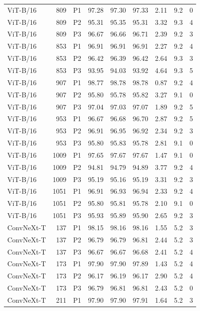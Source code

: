 {\begin{longtable}{lrlrrrrrr}
ViT-B/16 & 809 & P1 & 97.28 & 97.30 & 97.33 & 2.11 & 9.2 & 0 \\
ViT-B/16 & 809 & P2 & 95.31 & 95.35 & 95.31 & 3.32 & 9.3 & 4 \\
ViT-B/16 & 809 & P3 & 96.67 & 96.66 & 96.71 & 2.39 & 9.2 & 3 \\
ViT-B/16 & 853 & P1 & 96.91 & 96.91 & 96.91 & 2.27 & 9.2 & 4 \\
ViT-B/16 & 853 & P2 & 96.42 & 96.39 & 96.42 & 2.64 & 9.3 & 3 \\
ViT-B/16 & 853 & P3 & 93.95 & 94.03 & 93.92 & 4.64 & 9.3 & 5 \\
ViT-B/16 & 907 & P1 & 98.77 & 98.78 & 98.78 & 0.87 & 9.2 & 4 \\
ViT-B/16 & 907 & P2 & 95.80 & 95.78 & 95.82 & 3.27 & 9.1 & 0 \\
ViT-B/16 & 907 & P3 & 97.04 & 97.03 & 97.07 & 1.89 & 9.2 & 5 \\
ViT-B/16 & 953 & P1 & 96.67 & 96.68 & 96.70 & 2.87 & 9.2 & 5 \\
ViT-B/16 & 953 & P2 & 96.91 & 96.95 & 96.92 & 2.34 & 9.2 & 3 \\
ViT-B/16 & 953 & P3 & 95.80 & 95.83 & 95.78 & 2.81 & 9.1 & 0 \\
ViT-B/16 & 1009 & P1 & 97.65 & 97.67 & 97.67 & 1.47 & 9.1 & 0 \\
ViT-B/16 & 1009 & P2 & 94.81 & 94.79 & 94.89 & 3.77 & 9.2 & 4 \\
ViT-B/16 & 1009 & P3 & 95.19 & 95.16 & 95.19 & 3.31 & 9.2 & 3 \\
ViT-B/16 & 1051 & P1 & 96.91 & 96.93 & 96.94 & 2.33 & 9.2 & 4 \\
ViT-B/16 & 1051 & P2 & 95.80 & 95.81 & 95.78 & 2.10 & 9.1 & 0 \\
ViT-B/16 & 1051 & P3 & 95.93 & 95.89 & 95.90 & 2.65 & 9.2 & 3 \\
ConvNeXt-T & 137 & P1 & 98.15 & 98.16 & 98.16 & 1.55 & 5.2 & 3 \\
ConvNeXt-T & 137 & P2 & 96.79 & 96.79 & 96.81 & 2.44 & 5.2 & 3 \\
ConvNeXt-T & 137 & P3 & 96.67 & 96.67 & 96.68 & 2.41 & 5.2 & 4 \\
ConvNeXt-T & 173 & P1 & 97.90 & 97.90 & 97.89 & 1.43 & 5.2 & 4 \\
ConvNeXt-T & 173 & P2 & 96.17 & 96.19 & 96.17 & 2.90 & 5.2 & 4 \\
ConvNeXt-T & 173 & P3 & 96.79 & 96.81 & 96.81 & 2.43 & 5.2 & 0 \\
ConvNeXt-T & 211 & P1 & 97.90 & 97.90 & 97.91 & 1.64 & 5.2 & 3 \\

\end{longtable}}
